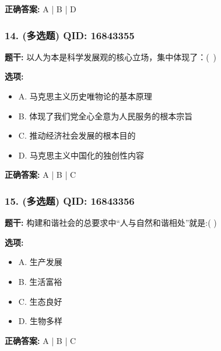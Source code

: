 \documentclass[12pt,UTF8]{ctexart}
\begin{document}
\textbf{正确答案:}
A | B | D

\vspace{0.3em}\hrulefill\vspace{0.7em}

\subsubsection*{14. (多选题) \small QID: 16843355}

\textbf{题干:}
以人为本是科学发展观的核心立场，集中体现了：( )

\textbf{选项:}
\begin{itemize}[leftmargin=*]

  \item A. 马克思主义历史唯物论的基本原理

  \item B. 体现了我们党全心全意为人民服务的根本宗旨

  \item C. 推动经济社会发展的根本目的

  \item D. 马克思主义中国化的独创性内容

\end{itemize}

\textbf{正确答案:}
A | B | C

\vspace{0.3em}\hrulefill\vspace{0.7em}

\subsubsection*{15. (多选题) \small QID: 16843356}

\textbf{题干:}
构建和谐社会的总要求中“人与自然和谐相处”就是:( )

\textbf{选项:}
\begin{itemize}[leftmargin=*]

  \item A. 生产发展

  \item B. 生活富裕

  \item C. 生态良好

  \item D. 生物多样

\end{itemize}

\textbf{正确答案:}
A | B | C

\vspace{0.3em}\hrulefill\vspace{0.7em}
\end{document}
